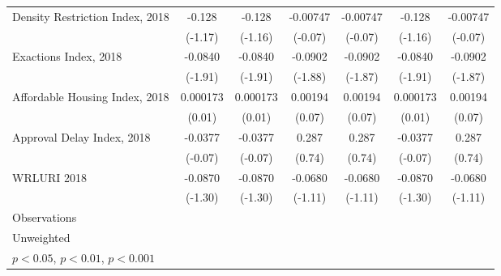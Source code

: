 \begin{table}[htbp]
\begin{tabular}{l*{6}{c}}
Density Restriction Index, 2018&      -0.128         &      -0.128         &    -0.00747         &    -0.00747         &      -0.128         &    -0.00747         \\
                    &     (-1.17)         &     (-1.16)         &     (-0.07)         &     (-0.07)         &     (-1.16)         &     (-0.07)         \\
\addlinespace
Exactions Index, 2018&     -0.0840         &     -0.0840         &     -0.0902         &     -0.0902         &     -0.0840         &     -0.0902         \\
                    &     (-1.91)         &     (-1.91)         &     (-1.88)         &     (-1.87)         &     (-1.91)         &     (-1.87)         \\
\addlinespace
Affordable Housing Index, 2018&    0.000173         &    0.000173         &     0.00194         &     0.00194         &    0.000173         &     0.00194         \\
                    &      (0.01)         &      (0.01)         &      (0.07)         &      (0.07)         &      (0.01)         &      (0.07)         \\
\addlinespace
Approval Delay Index, 2018&     -0.0377         &     -0.0377         &       0.287         &       0.287         &     -0.0377         &       0.287         \\
                    &     (-0.07)         &     (-0.07)         &      (0.74)         &      (0.74)         &     (-0.07)         &      (0.74)         \\
\addlinespace
WRLURI 2018         &     -0.0870         &     -0.0870         &     -0.0680         &     -0.0680         &     -0.0870         &     -0.0680         \\
                    &     (-1.30)         &     (-1.30)         &     (-1.11)         &     (-1.11)         &     (-1.30)         &     (-1.11)         \\
\midrule
Observations        &                     &                     &                     &                     &                     &                     \\
\bottomrule
\multicolumn{7}{l}{\footnotesize Unweighted}\\
\multicolumn{7}{l}{\footnotesize \sym{*} \(p<0.05\), \sym{**} \(p<0.01\), \sym{***} \(p<0.001\)}\\
\end{tabular}
\end{table}
